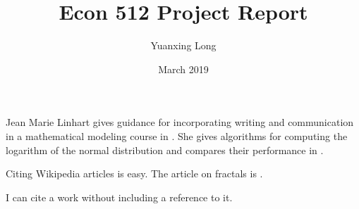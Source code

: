 \documentclass[12pt]{extarticle}
\title{Econ 512 Project Report}
\author{Yuanxing Long}
\date{March 2019}
\begin{document}
\maketitle

Jean Marie Linhart gives guidance for incorporating writing and communication in a mathematical modeling course in \cite{Linhart2014}.  She gives algorithms for computing the logarithm of the normal distribution and compares their performance in \cite{Linhart2008}.

Citing Wikipedia articles is easy.  The article on fractals is \cite{fractalwiki}.

I can cite a work without including a reference to it.  \nocite{higham1998handbook}




\end{document}
